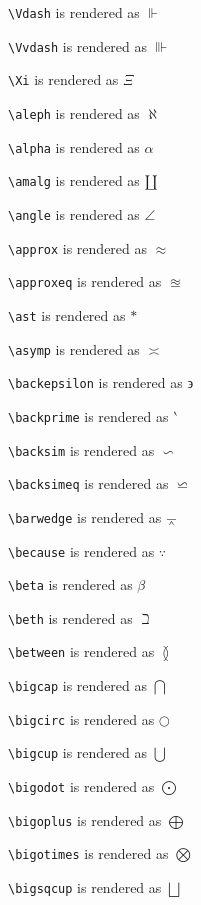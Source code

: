 \texttt{\textbackslash Vdash} is rendered as $\Vdash$

\texttt{\textbackslash Vvdash} is rendered as $\Vvdash$

\texttt{\textbackslash Xi} is rendered as $\Xi$

\texttt{\textbackslash aleph} is rendered as $\aleph$

\texttt{\textbackslash alpha} is rendered as $\alpha$

\texttt{\textbackslash amalg} is rendered as $\amalg$

\texttt{\textbackslash angle} is rendered as $\angle$

\texttt{\textbackslash approx} is rendered as $\approx$

\texttt{\textbackslash approxeq} is rendered as $\approxeq$

\texttt{\textbackslash ast} is rendered as $\ast$

\texttt{\textbackslash asymp} is rendered as $\asymp$

\texttt{\textbackslash backepsilon} is rendered as $\backepsilon$

\texttt{\textbackslash backprime} is rendered as $\backprime$

\texttt{\textbackslash backsim} is rendered as $\backsim$

\texttt{\textbackslash backsimeq} is rendered as $\backsimeq$

\texttt{\textbackslash barwedge} is rendered as $\barwedge$

\texttt{\textbackslash because} is rendered as $\because$

\texttt{\textbackslash beta} is rendered as $\beta$

\texttt{\textbackslash beth} is rendered as $\beth$

\texttt{\textbackslash between} is rendered as $\between$

\texttt{\textbackslash bigcap} is rendered as $\bigcap$

\texttt{\textbackslash bigcirc} is rendered as $\bigcirc$

\texttt{\textbackslash bigcup} is rendered as $\bigcup$

\texttt{\textbackslash bigodot} is rendered as $\bigodot$

\texttt{\textbackslash bigoplus} is rendered as $\bigoplus$

\texttt{\textbackslash bigotimes} is rendered as $\bigotimes$

\texttt{\textbackslash bigsqcup} is rendered as $\bigsqcup$

